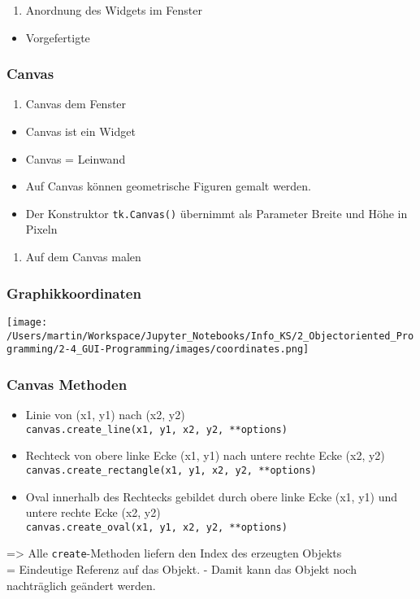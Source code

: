 \documentclass[
  11pt,
  a4paper,
  DIV=11,
  numbers=noendperiod]{scrartcl}
\providecommand{\tightlist}{%
  \setlength{\itemsep}{0pt}\setlength{\parskip}{0pt}}\usepackage{longtable,booktabs,array}
\begin{document}
\begin{enumerate}
\def\labelenumi{\arabic{enumi}.}
\setcounter{enumi}{3}
\tightlist
\item
  Anordnung des Widgets im Fenster
\end{enumerate}

\begin{itemize}
\tightlist
\item
  Vorgefertigte
\end{itemize}

\subsubsection{Canvas}\label{canvas}

\begin{enumerate}
\def\labelenumi{\arabic{enumi}.}
\tightlist
\item
  Canvas dem Fenster
\end{enumerate}

\begin{itemize}
\tightlist
\item
  Canvas ist ein Widget
\item
  Canvas = Leinwand
\item
  Auf Canvas können geometrische Figuren gemalt werden.
\item
  Der Konstruktor \texttt{tk.Canvas()} übernimmt als Parameter Breite
  und Höhe in Pixeln
\end{itemize}

\begin{enumerate}
\def\labelenumi{\arabic{enumi}.}
\setcounter{enumi}{1}
\tightlist
\item
  Auf dem Canvas malen
\end{enumerate}

\subsubsection{Graphikkoordinaten}\label{graphikkoordinaten}

\texttt{[image: /Users/martin/Workspace/Jupyter\_Notebooks/Info\_KS/2\_Objectoriented\_Programming/2-4\_GUI-Programming/images/coordinates.png]}

\subsubsection{Canvas Methoden}\label{canvas-methoden}

\begin{itemize}
\item
  Linie von (x1, y1) nach (x2, y2)\\
  \texttt{canvas.create\_line(x1,\ y1,\ x2,\ y2,\ **options)}
\item
  Rechteck von obere linke Ecke (x1, y1) nach untere rechte Ecke (x2,
  y2)\\
  \texttt{canvas.create\_rectangle(x1,\ y1,\ x2,\ y2,\ **options)}
\item
  Oval innerhalb des Rechtecks gebildet durch obere linke Ecke (x1, y1)
  und untere rechte Ecke (x2, y2)\\
  \texttt{canvas.create\_oval(x1,\ y1,\ x2,\ y2,\ **options)}
\end{itemize}

=\textgreater{} Alle \texttt{create}-Methoden liefern den Index des
erzeugten Objekts\\
= Eindeutige Referenz auf das Objekt. - Damit kann das Objekt noch
nachträglich geändert werden.
\end{document}
